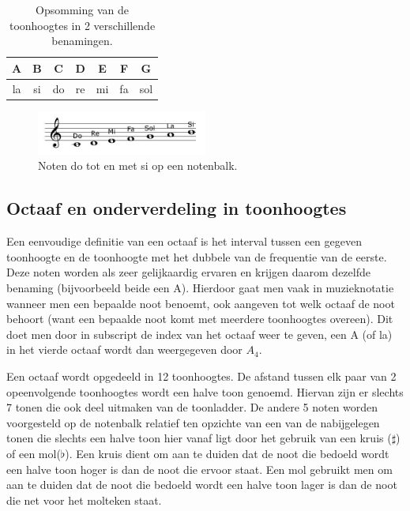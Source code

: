 \begin{table}
  \centering
  \begin{tabular}{ c c c c c c c }
    A & B & C & D & E & F & G \\
    \hline
    \hline
    la & si & do & re & mi & fa & sol \\
  \end{tabular}
  \caption{Opsomming van de toonhoogtes in 2 verschillende benamingen.}
  \label{tabel:toonhoogte}
\end{table}

\begin{figure}[!ht]
  \centering
  \includegraphics[width=0.5\textwidth]{1_Muzikale_Achtergrond/toonladder}
  \caption{Noten do tot en met si op een notenbalk.}
  \label{figuur:toonladder}
\end{figure}

\subsection{Octaaf en onderverdeling in toonhoogtes}
Een eenvoudige definitie van een octaaf is het interval tussen een gegeven toonhoogte en de toonhoogte met het dubbele van de frequentie van de eerste. Deze noten worden als zeer gelijkaardig ervaren en krijgen daarom dezelfde benaming (bijvoorbeeld beide een A). Hierdoor gaat men vaak in muzieknotatie wanneer men een bepaalde noot benoemt, ook aangeven tot welk octaaf de noot behoort (want een bepaalde noot komt met meerdere toonhoogtes overeen). Dit doet men door in subscript de index van het octaaf weer te geven, een A (of la) in het vierde octaaf wordt dan weergegeven door $A_{4}$.

Een octaaf wordt opgedeeld in 12 toonhoogtes. De afstand tussen elk paar van 2 opeenvolgende toonhoogtes wordt een halve toon genoemd. Hiervan zijn er slechts 7 tonen die ook deel uitmaken van de toonladder. De andere 5 noten worden voorgesteld op de notenbalk relatief ten opzichte van een van de nabijgelegen tonen die slechts een halve toon hier vanaf ligt door het gebruik van een kruis ($\sharp$) of een mol($\flat$). Een kruis dient om aan te duiden dat de noot die bedoeld wordt een halve toon hoger is dan de noot die ervoor staat. Een mol gebruikt men om aan te duiden dat de noot die bedoeld wordt een halve toon lager is dan de noot die net voor het molteken staat.

